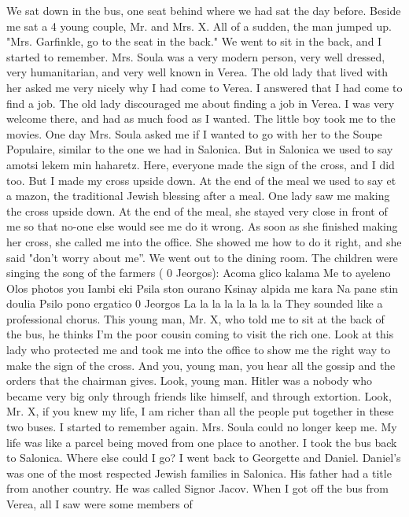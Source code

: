 We sat down in the 
bus, one seat behind where we had sat the day before.
Beside me sat a 4 
young couple, Mr.
and Mrs.
X. All of a sudden, the man jumped up.
"Mrs.
Garfinkle, go to the seat in the back."
We went to sit in the 
back, and I started to remember.
Mrs.
Soula was a very modern person, very well dressed, very humanitarian, and very well known in Verea.
The old lady that lived with her asked me very nicely why I had come to Verea.
I answered that I had come to find a job.
The old lady discouraged me about finding a 
job in Verea.
I was very welcome there, and had as much food as I wanted.
The little boy took me to the movies.
One day Mrs.
Soula asked me if I wanted to go with her to the Soupe Populaire, similar to the one we had in Salonica.
But in Salonica we used to say amotsi lekem min haharetz.
Here, everyone made the sign of the cross, and I did too.
But I made my cross upside down.
At the end of the meal we used to say 
et a mazon, the traditional Jewish blessing after a meal.
One 
lady saw me making the cross upside down.
At the end of the meal, she 
stayed very close in front of me so that no-one else would see me do it 
wrong.
As soon as she finished making her cross, she called me into the 
office.
She showed me how to do it right, and she said "don't worry 
about me”.
We went out to the dining room.
The children were singing the song of the farmers ( 0 Jeorgos): 
Acoma glico kalama 
Me to ayeleno 
Olos photos you Iambi eki 
Psila ston ourano 
Ksinay alpida me kara 
Na pane stin doulia 
Psilo pono ergatico 
0 Jeorgos La la la la la la la la 
They sounded like a professional chorus.
This young man, Mr.
X, who told me to sit at the back of the bus, 
he thinks I'm the poor cousin coming to visit the rich one.
Look at 
this lady who protected me and took me into the office to show me the 
right way to make the sign of the cross.
And you, young man, you hear 
all the gossip and the orders that the chairman gives.
Look, young man.
Hitler was a nobody who became very big only through friends like himself, and through extortion.
Look, Mr.
X, if you knew my life, I am 
richer than all the people put together in these two buses.
I started to remember again.
Mrs.
Soula could no longer keep me.
My life was like a parcel being moved from one place to another.
I took 
the bus back to Salonica.
Where else could I go?
I went back to Georgette and Daniel.
Daniel’s was one of the most respected Jewish families in Salonica.
His father had a title from another country.
He was called Signor Jacov.
When I got off the bus from Verea, all I saw were some members of 
